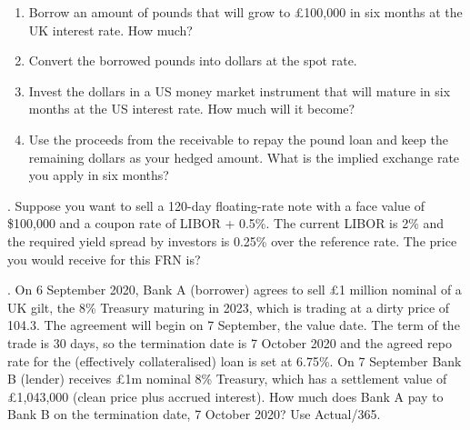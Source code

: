 \documentclass[11.5pt]{article}
\begin{document}
\begin{enumerate}
\item Borrow an amount of pounds that will grow to £100,000 in six months at the UK interest rate. How much?

\item Convert the borrowed pounds into dollars at the spot rate.

\item Invest the dollars in a US money market instrument that will mature in six months at the US interest rate. How much will it become?

\item Use the proceeds from the receivable to repay the pound loan and keep the remaining dollars as your hedged amount. What is the implied exchange rate you apply in six months?
\end{enumerate}




\newpage





. Suppose you want to sell a 120-day floating-rate note with a face value of \$100,000 and a coupon rate of LIBOR + 0.5\%. The current LIBOR is 2\% and the required yield spread by investors is 0.25\% over the reference rate. The price you would receive for this FRN is?

%
%
%


\vspace{80pt}



. On 6 September 2020, Bank A (borrower) agrees to sell £1 million nominal of a UK gilt, the 8\% Treasury maturing in 2023, which is trading at a dirty price of 104.3. The agreement will begin on 7 September, the value date. The term of the trade is 30 days, so the termination date is 7 October 2020 and the agreed repo rate for the (effectively collateralised) loan is set at 6.75\%. On 7 September Bank B (lender) receives £1m nominal 8\% Treasury, which has a settlement value of £1,043,000 (clean price plus accrued interest). How much does Bank A pay to Bank B on the termination date, 7 October 2020? Use Actual/365.
\end{document}

